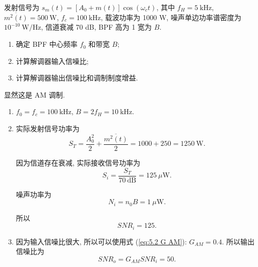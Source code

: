 \begin{exampleprob}
    发射信号为 $s_m(t)=[A_0+m(t)]\cos(\omega_ct)$, 其中 $f_H=5\ \text{kHz}$, $\overline{m^2(t)}=500\ \text{W}$, $f_c=100\ \text{kHz}$, 载波功率为 1000 W, 噪声单边功率谱密度为 $10^{-10}\ \text{W/Hz}$, 信道衰减 70 dB, BPF 高为 1 宽为 $B$.
    \begin{enumerate}[(1)]
        \item 确定 BPF 中心频率 $f_0$ 和带宽 $B$;
        \item 计算解调器输入信噪比;
        \item 计算解调器输出信噪比和调制制度增益.
    \end{enumerate}

    \begin{solution}
        显然这是 AM 调制.

        \begin{enumerate}[(1)]
            \item $f_0=f_c=100\ \text{kHz}$, $B=2f_H=10\ \text{kHz}$.
            \item 实际发射信号功率为
                  \begin{equation*}
                      S_T=\frac{A_0^2}{2}+\frac{\overline{m^2(t)}}{2}=1000+250=1250\ \text{W}.
                  \end{equation*}

                  因为信道存在衰减, 实际接收信号功率为
                  \begin{equation*}
                      S_i=\frac{S_T}{70\ \text{dB}}=125\ \mu\text{W}.
                  \end{equation*}

                  噪声功率为
                  \begin{equation*}
                      N_i=n_0B=1\ \mu\text{W}.
                  \end{equation*}

                  所以
                  \begin{equation*}
                      SNR_i=125.
                  \end{equation*}
            \item 因为输入信噪比很大, 所以可以使用式 (\ref{eq:5.2 G AM}): $G_{AM}=0.4$. 所以输出信噪比为
                  \begin{equation*}
                      SNR_o=G_{AM}SNR_i=50.
                  \end{equation*}
        \end{enumerate}
    \end{solution}
\end{exampleprob}
